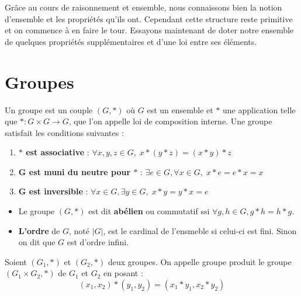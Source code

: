 
\minitoc  %

Grâce au cours de raisonnement et ensemble, nous connaissons bien la notion d'ensemble et les propriétés qu'ils ont. 
Cependant cette structure reste primitive et on commence à en faire le tour. 
Essayons maintenant de doter notre ensemble de quelques propriétés supplémentaires et d'une loi entre ses éléments. 


\section{Groupes}

\begin{definition}[Groupe]
    Un groupe est un couple $(G,*)$ où $G$ est un ensemble et $*$ une application telle que $* : G \times G \rightarrow G$, que l'on appelle loi de composition interne.
    Une groupe satisfait les conditions suivantes :
    \begin{enumerate}
        \item \textbf{$*$ est associative} : $ \forall x, y, z \in G, \; x * (y * z) = (x * y) * z $
        \item \textbf{G est muni du neutre pour $*$} : $ \exists e \in G, \forall x \in G, \; x * e = e * x = x $ 
        \item \textbf{G est inversible} : $ \forall x \in G, \exists y \in G, \; x * y = y * x = e $
    \end{enumerate}
\end{definition}

\begin{remark}
    \begin{itemize}
        \item Le groupe $(G,*)$ est dit \textbf{abélien} ou commutatif ssi $ \forall g,h \in G, g*h = h*g $.
        \item \textbf{L'ordre} de $G$, noté $|G|$, est le cardinal de l'ensmeble si celui-ci est fini. Sinon on dit que $G$ est d'ordre infini.
    \end{itemize}
\end{remark}

\begin{definition}
    Soient $(G_1, *)$ et $(G_2, *)$ deux groupes. On appelle groupe produit le groupe $(G_1 \times G_2, *)$ de $G_1$ et $G_2$ en posant : \[ (x_1, x_2) * (y_1, y_2) = (x_1 * y_1, x_2 * y_2) \]
\end{definition}

